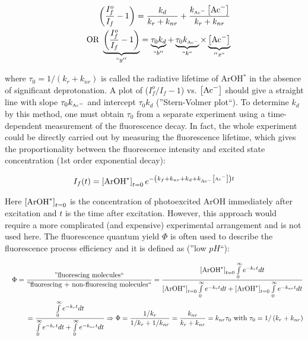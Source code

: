 \documentclass[byrevtex,amssymb,aps,pra,floatfix,letterpaper]{revtex4}
\begin{document}
\begin{eqnarray}
\label{eq13}
& & \left(\frac{I_f^o}{I_f} - 1\right) = \frac{k_d}{k_r + k_{nr}} + \frac{k_{\textnormal{\tiny Ac}^-}\left[\textnormal{Ac}^-\right]}{k_r + k_{nr}}\\
\nonumber
& & \textnormal{OR }\underbrace{\left(\frac{I_f^o}{I_f} - 1\right)}_{``y''} = \underbrace{\tau_0k_d}_{``b''} + \underbrace{\tau_0k_{\textnormal{\tiny Ac}^-}}_{``k``}\times\underbrace{\left[\textnormal{Ac}^-\right]}_{''x``}
\end{eqnarray}

\noindent
where $\tau_0 = 1 / (k_r + k_{nr})$ is called the radiative lifetime of ArOH$^*$ in the absence of significant deprotonation. A plot of ($I_f^o / I_f - 1$) vs. $\left[\textnormal{Ac}^-\right]$ should give a straight line with slope $\tau_0k_{\textnormal{\tiny Ac}^-}$ and intercept $\tau_0k_d$ (''Stern-Volmer plot``). To determine $k_d$ by this method, one must obtain $\tau_0$ from a separate experiment using a time-dependent measurement of the fluorescence decay. In fact, the whole experiment could be directly carried out by measuring the fluorescence lifetime, which gives the proportionality between the fluorescence intensity and excited state concentration (1st order exponential decay):

\begin{equation}
I_f(t) = \left[\textnormal{ArOH}^*\right]_{t=0}e^{-\left(k_f + k_{nr} + k_d + k_{\textnormal{\tiny Ac}^-}\left[\textnormal{\tiny Ac}^-\right]\right)t}
\label{eq14}
\end{equation}

\noindent
Here $\left[\textnormal{ArOH}^*\right]_{t=0}$ is the concentration of photoexcited ArOH immediately after excitation and $t$ is the time after excitation. However, this approach would require a more complicated (and expensive) experimental arrangement and is not used here. The fluorescence quantum yield $\Phi$ is often used to describe the fluorescence process efficiency and it is defined as (''low $pH$``):

\begin{eqnarray}
\label{eq15}
& & \Phi = \frac{\textnormal{''fluorescing molecules``}}{\textnormal{''fluorescing + non-fluorescing molecules``}} =
\frac{\left[\textnormal{ArOH}^*\right]_{t=0}\int\limits_0^\infty e^{-k_r t}dt}{\left[\textnormal{ArOH}^*\right]_{t=0}\int\limits_0^\infty e^{-k_r t}dt + \left[\textnormal{ArOH}^*\right]_{t=0}\int\limits_0^\infty e^{-k_{nr}t}dt}\\
\nonumber
& & = \frac{\int\limits_0^\infty e^{-k_r t}dt}{\int\limits_0^\infty e^{-k_r t}dt + \int\limits_0^\infty e^{-k_{nr}t}dt} \Rightarrow \Phi = \frac{1/k_r}{1/k_r + 1/k_{nr}}
= \frac{k_{nr}}{k_r + k_{nr}} = k_{nr}\tau_0\textnormal{ with }\tau_0 = 1/\left(k_r + k_{nr}\right)
\end{eqnarray}
\end{document}
